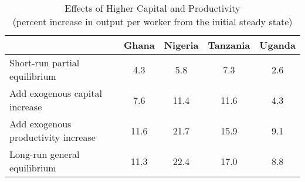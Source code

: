 \begin{table}[H] 
\center 
\singlespace 
\caption{Effects of Higher Capital and Productivity \\ (percent increase in output per worker from the initial steady state)} \label{decomp2}
\vspace{-.1in} 
\begin{tabular}{l c c c c}\hline 
   & Ghana & Nigeria & Tanzania & Uganda    \\  
\hline 
 Short-run partial equilibrium &      4.3 &      5.8 &      7.3  &      2.6    \\   Add exogenous capital increase &      7.6 &     11.4 &     11.6  &      4.3    \\   Add exogenous productivity increase &     11.6 &     21.7 &     15.9  &      9.1    \\   Long-run general equilibrium &     11.3 &     22.4 &     17.0  &      8.8    \\  \hline 
\end{tabular}
\end{table} 

